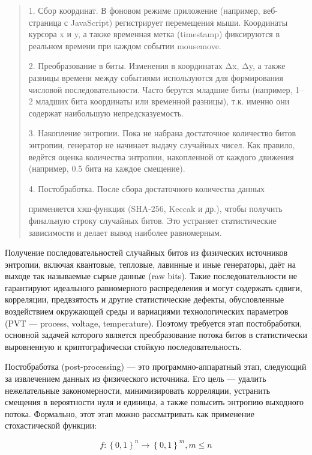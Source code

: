 \begin{quote}
1. Сбор координат. В фоновом режиме приложение (например, веб-страница с
JavaScript) регистрирует перемещения мыши. Координаты курсора x и y, а
также временная метка (timestamp) фиксируются в реальном времени при
каждом событии mousemove.

2. Преобразование в биты. Изменения в координатах Δx, Δy, а также
разницы времени между событиями используются для формирования числовой
последовательности. Часто берутся младшие биты (например, 1--2 младших
бита координаты или временной разницы), т.к. именно они содержат
наибольшую непредсказуемость.

3. Накопление энтропии. Пока не набрана достаточное количество битов
энтропии, генератор не начинает выдачу случайных чисел. Как правило,
ведётся оценка количества энтропии, накопленной от каждого движения
(например, 0.5 бита на каждое смещение).

4. Постобработка. После сбора достаточного количества данных

применяется хэш-функция (SHA-256, Keccak и др.), чтобы получить
финальную строку случайных битов. Это устраняет статистические
зависимости и делает вывод наиболее равномерным.
\end{quote}


Получение последовательностей случайных битов из физических источников
энтропии, включая квантовые, тепловые, лавинные и иные генераторы, даёт
на выходе так называемые сырые данные (raw bits). Такие
последовательности не гарантируют идеального равномерного распределения
и могут содержать сдвиги, корреляции, предвзятость и другие
статистические дефекты, обусловленные воздействием окружающей среды и
вариациями технологических параметров (PVT --- process, voltage,
temperature). Поэтому требуется этап постобработки, основной задачей
которого является преобразование потока битов в статистически
выровненную и криптографически стойкую последовательность.

Постобработка (post-processing) --- это программно-аппаратный этап,
следующий за извлечением данных из физического источника. Его цель ---
удалить нежелательные закономерности, минимизировать корреляции,
устранить смещения в вероятности нуля и единицы, а также повысить
энтропию выходного потока. Формально, этот этап можно рассматривать как
применение стохастической функции:

\[f:\left\{ 0,1 \right\}^{n} \rightarrow \left\{ 0,1 \right\}^{m},m \leq n\]

